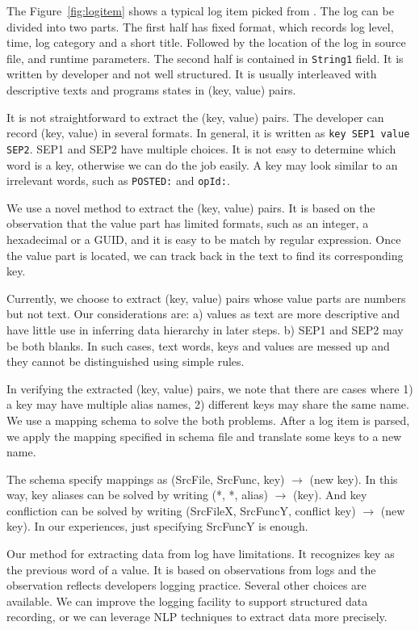 The Figure~\ref{fig:logitem} shows a typical log item picked
from \cosmos.  The \cosmos log can be divided into two parts.
The first half has fixed format, which records log level,
time, log category and a short title. Followed by the
location of the log in source file, and runtime parameters.
The second half is contained in \texttt{String1} field. It
is written by developer and not well structured. It is
usually interleaved with descriptive texts and programs
states in (key, value) pairs.

It is not straightforward to extract the (key, value) pairs.
The developer can record (key, value) in several formats. In
general, it is written as \texttt{key SEP1 value SEP2}. SEP1
and SEP2 have multiple choices. It is not easy to determine
which word is a key, otherwise we can do the job easily. A
key may look similar to an irrelevant words, such as
\texttt{POSTED:} and \texttt{opId:}.

We use a novel method to extract the (key, value) pairs. It
is based on the observation that the value part has limited
formats, such as an integer, a hexadecimal or a GUID, and it
is easy to be match by regular expression. Once the value
part is located, we can track back in the text to find its
corresponding key.

Currently, we choose to extract (key, value) pairs whose
value parts are numbers but not text. Our considerations
are: a) values as text are more descriptive and have
little use in inferring data hierarchy in later steps. b)
SEP1 and SEP2 may be both blanks. In such cases,
text words, keys and values are messed up and they cannot be
distinguished using simple rules.

In verifying the extracted (key, value) pairs, we note that
there are cases where 1) a key may have multiple alias names,
2) different keys may share the same name. We use a mapping
schema to solve the both problems. After a log item is
parsed, we apply the mapping specified in schema file and
translate some keys to a new name.

The schema specify mappings as (SrcFile, SrcFunc, key) $\to$
(new key). In this way, key aliases can be solved by
writing (*, *, alias) $\to$ (key). And key confliction can
be solved by writing (SrcFileX, SrcFuncY, conflict key) $\to$
(new key). In our experiences, just specifying SrcFuncY is
enough.

Our method for extracting data from log have limitations. It
recognizes key as the previous word of a value. It is based
on observations from logs and the observation reflects
developers logging practice. Several other choices are
available. We can improve the logging facility to support
structured data recording, or we can leverage NLP techniques
to extract data more precisely.

